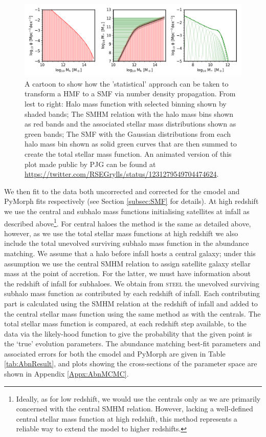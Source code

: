 \begin{figure}[h]
    \centering
    \includegraphics[width = \linewidth]{Figures/Chapter2/gaussian_buildup.png}
    \caption{A cartoon to show how the 'statistical' approach can be taken to transform a HMF to a SMF via number density propagation. From lest to right: Halo mass function with selected binning shown by shaded bands; The SMHM relation with the halo mass bins shown as red bands and the associated stellar mass distributions shown as green bands; The SMF with the Gaussian distributions from each halo mass bin shown as solid green curves that are then summed to create the total stellar mass function. An animated version of this plot made public by PJG can be found at \url{https://twitter.com/RSEGrylls/status/1231279549704474624}.}
    \label{fig:Gauss_build}
\end{figure}

We then fit to the \cite{Davidzon2017TheSnapshots} data both uncorrected and corrected for the cmodel and PyMorph fits respectively (see Section \ref{subsec:SMF} for details). At high redshift we use the central and subhalo mass functions initialising satellites at infall as described above\footnote{Ideally, as for low redshift, we would use the centrals only as we are primarily concerned with the central SMHM relation. However, lacking a well-defined central stellar mass function at high redshift, this method represents a reliable way to extend the model to higher redshifts.}. For central haloes the method is the same as detailed above, however, as we use the total stellar mass functions at high redshift we also include the total unevolved surviving subhalo mass function in the abundance matching. 
We assume that a halo before infall hosts a central galaxy; under this assumption we use the central SMHM relation to assign satellite galaxy stellar mass at the point of accretion. For the latter, we must have information about the redshift of infall for subhaloes. We obtain from \textsc{steel} the unevolved surviving subhalo mass function as contributed by each redshift of infall. Each contributing part is calculated using the SMHM relation at the redshift of infall and added to the central stellar mass function using the same method as with the centrals. The total stellar mass function is compared, at each redshift step available, to the data via the likely-hood function to give the probability that the given point is the `true' evolution parameters. The abundance matching best-fit parameters and associated errors for both the cmodel and PyMorph are given in Table \ref{tab:AbnResult}, and plots showing the cross-sections of the parameter space are shown in Appendix \ref{Appx:AbnMCMC}.

